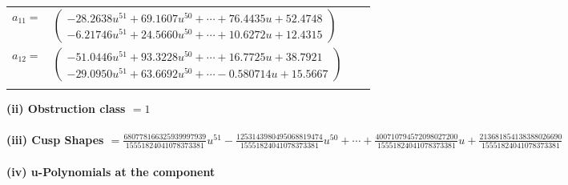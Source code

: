 \documentclass[1p]{elsarticle_modified}
\theoremstyle{definition}
\begin{document}
\begin{tabular}{m{7pt} m{180pt} m{7pt} m{180pt} }
\flushright $a_{11}=$&$\begin{pmatrix}-28.2638 u^{51}+69.1607 u^{50}+\cdots+76.4435 u+52.4748\\-6.21746 u^{51}+24.5660 u^{50}+\cdots+10.6272 u+12.4315\end{pmatrix}$ \\
\flushright $a_{12}=$&$\begin{pmatrix}-51.0446 u^{51}+93.3228 u^{50}+\cdots+16.7725 u+38.7921\\-29.0950 u^{51}+63.6692 u^{50}+\cdots-0.580714 u+15.5667\end{pmatrix}$\\&\end{tabular}
\flushleft \textbf{(ii) Obstruction class $= 1$}\\~\\
\flushleft \textbf{(iii) Cusp Shapes $= \frac{680778166325939997939}{15551824041078373381} u^{51}-\frac{1253143980495068819474}{15551824041078373381} u^{50}+\cdots+\frac{400710794572098027200}{15551824041078373381} u+\frac{213681854138388026690}{15551824041078373381}$}\\~\\
\newpage\renewcommand{\arraystretch}{1}
\flushleft \textbf{(iv) u-Polynomials at the component}\newline \\
\end{document}
